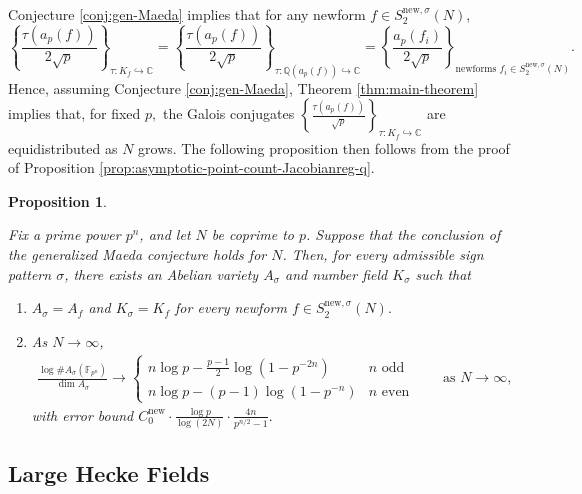 \documentclass[11pt,letterpaper,reqno]{amsart}
\newtheorem{proposition}[theorem]{Proposition}
\theoremstyle{definition}
\numberwithin{equation}{section}
\numberwithin{figure}{section}
\numberwithin{table}{section}
\let\subsectiontemp\subsection
\renewcommand{\subsection}[1]{ 
    \subsectiontemp{#1} \hfill\vspace{0.5\linespacing} 
}
\newcommand{\nw}{\mathrm{new}}
\begin{document}
Conjecture \ref{conj:gen-Maeda} implies that for any newform $f \in S_2^{\nw,\sigma}(N)$,
\begin{equation}
    \left\{\frac{\tau(a_p(f))}{2\sqrt{p}}\right\}_{\tau: K_f \hookrightarrow \mathbb{C}}
    =
    \left\{\frac{\tau(a_p(f))}{2\sqrt{p}}\right\}_{\tau: \mathbb{Q}({a_p(f)}) \hookrightarrow \mathbb{C}}
    =
    \left\{\frac{a_p(f_i)}{2\sqrt{p}}\right\}_{\text{newforms } f_i \in S_2^{\mathrm{new},\sigma}(N)}.\label{eqn:conjugates-are-equidistributed}
\end{equation}
Hence, assuming Conjecture \ref{conj:gen-Maeda}, Theorem \ref{thm:main-theorem} implies that, for fixed $p,$ the Galois conjugates $\left\{ \frac{\tau(a_p(f))}{\sqrt{p}} \right\}_{\tau: K_f \hookrightarrow \mathbb{C}}$ are equidistributed as $N$ grows. The following proposition then follows from the proof of Proposition \ref{prop:asymptotic-point-count-Jacobianreg-q}.

\begin{proposition}
\label{thm:asymptotic-point-count}

Fix a prime power $p^n$, and let $N$ be coprime to $p$. Suppose that the conclusion of the generalized Maeda conjecture holds for $N$. Then, for every admissible sign pattern $\sigma$, there exists an Abelian variety $A_\sigma$ and number field $K_\sigma$ such that
\begin{enumerate}
    \item $A_\sigma=A_f$ and $K_\sigma=K_f$
for every newform $f\in S_2^{\mathrm{new},\sigma}(N).$
\item As $N \rightarrow \infty$,
\begin{align}
    \frac{\log \#A_\sigma(\mathbb F_{p^n})}
{\dim A_\sigma}
\longrightarrow
\begin{cases}
\displaystyle
n\log p - \frac{p-1}{2}\log\!\left(1-p^{-2n}\right)
& \text{$n$ odd}\\[10pt]
\displaystyle
n\log p - (p-1)\log\!\left(1-p^{-n}\right)
& \text{$n$ even}
\end{cases}
\qquad\text{as }N\to\infty,
\end{align}
with error bound $C_0^\nw \cdot \frac{\log p}{\log (2N)} \cdot \frac{4n}{p^{n/2} - 1}.$
\end{enumerate}
\end{proposition}


\subsection{Large Hecke Fields} \label{subsection:large-hecke-fields}
\end{document}
